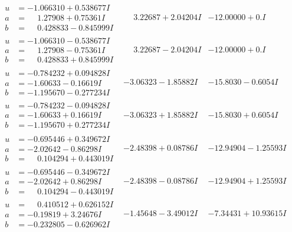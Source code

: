 \documentclass[1p]{elsarticle_modified}
\theoremstyle{definition}
\begin{document}
$$\begin{array}{c|c|c}
\begin{aligned}
u &= -1.066310 + 0.538677 I \\
a &= \phantom{-}1.27908 + 0.75361 I \\
b &= \phantom{-}0.428833 - 0.845999 I\end{aligned}
 & \phantom{-}3.22687 + 2.04204 I & -12.00000 + 0. I\phantom{ +0.000000I} \\ \hline\begin{aligned}
u &= -1.066310 - 0.538677 I \\
a &= \phantom{-}1.27908 - 0.75361 I \\
b &= \phantom{-}0.428833 + 0.845999 I\end{aligned}
 & \phantom{-}3.22687 - 2.04204 I & -12.00000 + 0. I\phantom{ +0.000000I} \\ \hline\begin{aligned}
u &= -0.784232 + 0.094828 I \\
a &= -1.60633 - 0.16619 I \\
b &= -1.195670 - 0.277234 I\end{aligned}
 & -3.06323 - 1.85882 I & -15.8030 - 0.6054 I \\ \hline\begin{aligned}
u &= -0.784232 - 0.094828 I \\
a &= -1.60633 + 0.16619 I \\
b &= -1.195670 + 0.277234 I\end{aligned}
 & -3.06323 + 1.85882 I & -15.8030 + 0.6054 I \\ \hline\begin{aligned}
u &= -0.695446 + 0.349672 I \\
a &= -2.02642 - 0.86298 I \\
b &= \phantom{-}0.104294 + 0.443019 I\end{aligned}
 & -2.48398 + 0.08786 I & -12.94904 - 1.25593 I \\ \hline\begin{aligned}
u &= -0.695446 - 0.349672 I \\
a &= -2.02642 + 0.86298 I \\
b &= \phantom{-}0.104294 - 0.443019 I\end{aligned}
 & -2.48398 - 0.08786 I & -12.94904 + 1.25593 I \\ \hline\begin{aligned}
u &= \phantom{-}0.410512 + 0.626152 I \\
a &= -0.19819 + 3.24676 I \\
b &= -0.232805 - 0.626962 I\end{aligned}
 & -1.45648 - 3.49012 I & -7.34431 + 10.93615 I \\ \hline\begin{aligned}

\end{aligned}
\end{array}$$
\end{document}
